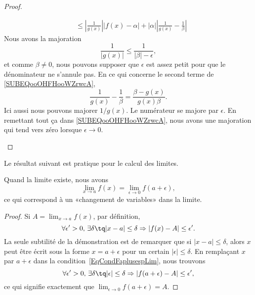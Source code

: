 \begin{proof}
\begin{subproof}
\begin{subequations}
\begin{align}
				                                                   & \leq | \frac{1}{ g(x) } | |f(x)-\alpha |+| \alpha | |\frac{1}{ g(x) }-\frac{1}{ \beta } |  \label{SUBEQooOHFHooWZrwcA}
			\end{align}
		\end{subequations}
		Nous avons la majoration
		\begin{equation}
			\frac{1}{ | g(x) | }\leq \frac{1}{ | \beta |-\epsilon },
		\end{equation}
		et comme \( \beta\neq 0\), nous pouvons supposer que \( \epsilon\) est assez petit pour que le dénominateur ne s'annule pas. En ce qui concerne le second terme de \eqref{SUBEQooOHFHooWZrwcA},
		\begin{equation}
			\frac{1}{ g(x) }-\frac{1}{ \beta }=\frac{ \beta-g(x) }{ g(x)\beta }.
		\end{equation}
		Ici aussi nous pouvons majorer \( 1/g(x)\). Le numérateur se majore par \( \epsilon\). En remettant tout ça dans \eqref{SUBEQooOHFHooWZrwcA}, nous avons une majoration qui tend vers zéro lorsque \( \epsilon\to 0\).
	\end{subproof}
\end{proof}

Le résultat suivant est pratique pour le calcul des limites.
\begin{proposition}     \label{PropChmVarLim}
	Quand la limite existe, nous avons
	\[
		\lim_{x\to a}f(x)=\lim_{\epsilon\to 0}f(a+\epsilon),
	\]
	ce qui correspond à un «changement de variables» dans la limite.
\end{proposition}

\begin{proof}
	Si \( A=\lim_{x\to a}f(x)\), par définition,
	\begin{equation}        \label{EqCondFaplusespLim}
		\forall\epsilon'>0,\,\exists\delta \tq | x-a |\leq\delta\Rightarrow| f(x)-A |\leq\epsilon'.
	\end{equation}
	La seule subtilité de la démonstration est de remarquer que si \( | x-a |\leq\delta\), alors \( x\) peut être écrit sous la forme \( x=a+\epsilon\) pour un certain \( | \epsilon |\leq\delta\). En remplaçant \( x\) par \( a+\epsilon\) dans la condition~\ref{EqCondFaplusespLim}, nous trouvons
	\begin{equation}
		\forall\epsilon'>0,\,\exists\delta \tq | \epsilon |\leq\delta\Rightarrow| f(a+\epsilon)-A |\leq\epsilon',
	\end{equation}
	ce qui signifie exactement que \( \lim_{\epsilon\to 0}f(a+\epsilon)=A\).
\end{proof}

